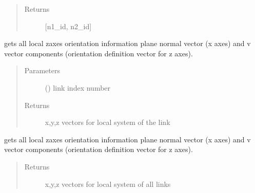 \documentclass[letterpaper,10pt,english]{sphinxmanual}
\begin{document}
\begin{fulllineitems}
\begin{fulllineitems}
\begin{quote}
\begin{description}
\item[{Returns}] \leavevmode
{[}n1\_id, n2\_id{]}

\end{description}\end{quote}

\end{fulllineitems}


\begin{fulllineitems}
\label{\detokenize{api:beamon.database.Database.get_link_orientation}}
gets all local z\sphinxhyphen{}axes orientation information \sphinxhyphen{} plane normal vector (x axes) and v vector components
(orientation definition vector for z axes).
\begin{quote}\begin{description}
\item[{Parameters}] \leavevmode
{} () \textendash{} link index number

\item[{Returns}] \leavevmode
x,y,z vectors for local system of the link

\end{description}\end{quote}

\end{fulllineitems}


\begin{fulllineitems}
\label{\detokenize{api:beamon.database.Database.get_link_orientations}}
gets all local z\sphinxhyphen{}axes orientation information \sphinxhyphen{} plane normal vector (x axes) and v vector components
(orientation definition vector for z axes).
\begin{quote}\begin{description}
\item[{Returns}] \leavevmode
x,y,z vectors for local system of all links


\end{description}
\end{quote}
\end{fulllineitems}
\end{fulllineitems}
\end{document}

